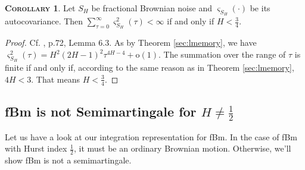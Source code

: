 \documentclass[a4paper, twoside, 11pt]{article}
\theoremstyle{definition}
\newtheorem{corollary}[definition]{\scshape Corollary}
\begin{document}
	\begin{corollary}
	  Let $S_H$ be fractional Brownian noise and $\varsigma_{S_H}(\cdot)$ be its autocovariance. Then $\sum_{\tau=0}^{\infty}\varsigma^2_{S_H}(\tau)<\infty$ if and only if $H < \frac{3}{4}$.
	\end{corollary}
	\begin{proof}
		Cf. \cite{nourdin}, p.72, Lemma 6.3. As by Theorem \ref{sec:lmemory}, we have $\varsigma_{S_H}^2(\tau) = H^2(2H-1)^2\tau^{4H-4} + \mathrm{o}(1) $. The summation over the range of $\tau$ is finite if and only if, according to the same reason as in Theorem \ref{sec:lmemory}, $4H<3$. That means $H < \frac{3}{4}$.
	\end{proof}
  \subsection{fBm is not Semimartingale for $H\neq \frac{1}{2}$}
  Let us have a look at our integration representation for fBm. In the case of fBm with Hurst index $\frac{1}{2}$, it must be an ordinary Brownian motion. Otherwise, we'll show fBm is not a semimartingale.
\end{document}
